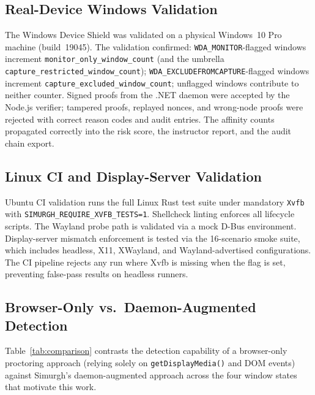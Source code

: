 \documentclass[conference]{IEEEtran}
\begin{document}
\subsection{Real-Device Windows Validation}

The Windows Device Shield was validated on a physical Windows~10 Pro machine (build~19045). The validation confirmed: \texttt{WDA\_MONITOR}-flagged windows increment \texttt{monitor\_only\_window\_count} (and the umbrella \texttt{capture\_restricted\_window\_count}); \texttt{WDA\_EXCLUDEFROMCAPTURE}-flagged windows increment \texttt{capture\_excluded\_window\_count}; unflagged windows contribute to neither counter. Signed proofs from the .NET daemon were accepted by the Node.js verifier; tampered proofs, replayed nonces, and wrong-node proofs were rejected with correct reason codes and audit entries. The affinity counts propagated correctly into the risk score, the instructor report, and the audit chain export.

\subsection{Linux CI and Display-Server Validation}

Ubuntu CI validation runs the full Linux Rust test suite under mandatory \texttt{Xvfb} with \texttt{SIMURGH\_REQUIRE\_XVFB\_TESTS=1}. Shellcheck linting enforces all lifecycle scripts. The Wayland probe path is validated via a mock D-Bus environment. Display-server mismatch enforcement is tested via the 16-scenario smoke suite, which includes headless, X11, XWayland, and Wayland-advertised configurations. The CI pipeline rejects any run where Xvfb is missing when the flag is set, preventing false-pass results on headless runners.

\subsection{Browser-Only vs.\ Daemon-Augmented Detection}

Table~\ref{tab:comparison} contrasts the detection capability of a browser-only proctoring approach (relying solely on \texttt{getDisplayMedia()} and DOM events) against Simurgh's daemon-augmented approach across the four window states that motivate this work.
\end{document}
